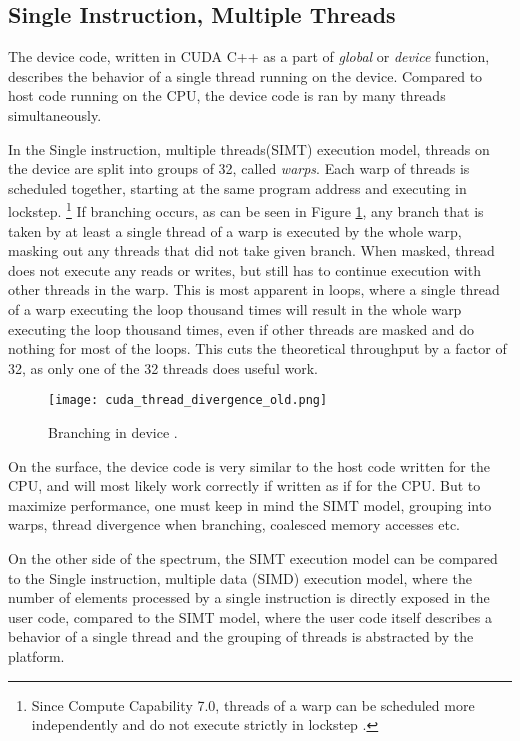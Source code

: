 \subsection{Single Instruction, Multiple Threads}
\label{sec:simt}

The device code, written in CUDA C++ as a part of \textit{global} or \textit{device} function, describes the behavior of a single thread running on the device. Compared to host code running on the CPU, the device code is ran by many threads simultaneously.



In the Single instruction, multiple threads(SIMT) execution model, threads on the device are split into groups of 32, called \textit{warps}. Each warp of threads is scheduled together, starting at the same program address and executing in lockstep. \footnote{Since Compute Capability 7.0, threads of a warp can be scheduled more independently and do not execute strictly in lockstep \citep{paper:volta}.}
If branching occurs, as can be seen in Figure \ref{fig:thread_divergence_old}, any branch that is taken by at least a single thread of a warp is executed by the whole warp, masking out any threads that did not take given branch. When masked, thread does not execute any reads or writes, but still has to continue execution with other threads in the warp. This is most apparent in loops, where a single thread of a warp executing the loop thousand times will result in the whole warp executing the loop thousand times, even if other threads are masked and do nothing for most of the loops. This cuts the theoretical throughput by a factor of 32, as only one of the 32 threads does useful work.

\begin{figure}[h]
	\centering
	\texttt{[image: cuda\_thread\_divergence\_old.png]}
	\caption{Branching in device \citep{site:cuda}.}
	\label{fig:thread_divergence_old}
\end{figure}


On the surface, the device code is very similar to the host code written for the CPU, and will most likely work correctly if written as if for the CPU. But to maximize performance, one must keep in mind the SIMT model, grouping into warps, thread divergence when branching, coalesced memory accesses etc.

On the other side of the spectrum, the SIMT execution model can be compared to the Single instruction, multiple data (SIMD) execution model, where the number of elements processed by a single instruction is directly exposed in the user code, compared to the SIMT model, where the user code itself describes a behavior of a single thread and the grouping of threads is abstracted by the platform. 


